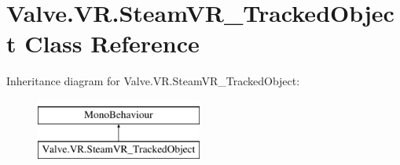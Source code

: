 \hypertarget{class_valve_1_1_v_r_1_1_steam_v_r___tracked_object}{}\section{Valve.\+V\+R.\+Steam\+V\+R\+\_\+\+Tracked\+Object Class Reference}
\label{class_valve_1_1_v_r_1_1_steam_v_r___tracked_object}
Inheritance diagram for Valve.\+V\+R.\+Steam\+V\+R\+\_\+\+Tracked\+Object\+:\begin{figure}[H]
\begin{center}
\leavevmode
\includegraphics[height=2.000000cm]{class_valve_1_1_v_r_1_1_steam_v_r___tracked_object}
\end{center}
\end{figure}
